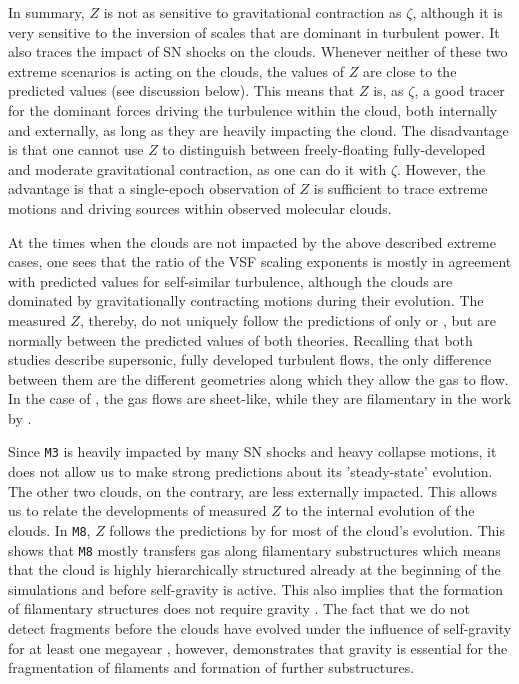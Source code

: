 In summary, $Z$ is not as sensitive to gravitational contraction as $\zeta$, although it is very sensitive to the inversion of scales that are dominant in turbulent power.
It also traces the impact of SN shocks on the clouds.
Whenever neither of these two extreme scenarios is acting on the clouds, the values of $Z$ are close to the predicted values (see discussion below).
This means that $Z$ is, as $\zeta$, a good tracer for the dominant forces driving the turbulence within the cloud, both internally and externally, as long as they are heavily impacting the cloud.
The disadvantage is that one cannot use $Z$ to distinguish between freely-floating fully-developed and moderate gravitational contraction, as one can do it with $\zeta$.
However, the advantage is that a single-epoch observation of $Z$ is sufficient to trace extreme motions and driving sources within observed molecular clouds.

At the times when the clouds are not impacted by the above described extreme cases, one sees that the ratio of the VSF scaling exponents is mostly in agreement with predicted values for self-similar turbulence, although the clouds are dominated by gravitationally contracting motions during their evolution.
The measured $Z$, thereby, do not uniquely follow the predictions of only \citet{Boldyrev2002} or \citet{She1994}, but are normally between the predicted values of both theories. 
Recalling that both studies describe supersonic, fully developed turbulent flows, the only difference between them are the different geometries along which they allow the gas to flow.
In the case of \citet{Boldyrev2002}, the gas flows are sheet-like, while they are filamentary in the work by \citet{She1994}.

Since \texttt{M3} is heavily impacted by many SN shocks and heavy collapse motions, it does not allow us to make strong predictions about its 'steady-state' evolution.
The other two clouds, on the contrary, are less externally impacted.
This allows us to relate the developments of measured $Z$ to the internal evolution of the clouds.
In \texttt{M8}, $Z$ follows the predictions by \citet{She1994} for most of the cloud's evolution. 
This shows that \texttt{M8} mostly transfers gas along filamentary substructures which means that the cloud is highly hierarchically structured already at the beginning of the simulations and before self-gravity is active.
This also implies that the formation of filamentary structures does not require gravity \citep[e.g.,][]{Federrath2016}.
The fact that we do not detect fragments before the clouds have evolved under the influence of self-gravity for at least one megayear , however, demonstrates that gravity is essential for the fragmentation of filaments and formation of further substructures.

